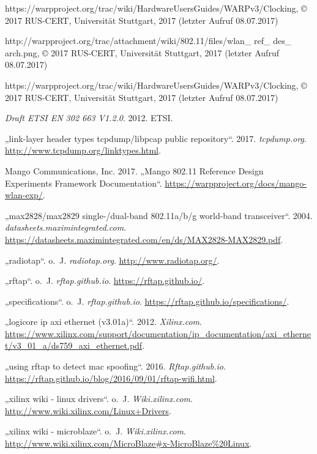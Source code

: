 \documentclass[letterpaper,11pt]{article}
\begin{document}
\begin{onehalfspace}
\begin{thebibliography}{xxxxxxxxxxxxxxxxxxx}
 https://warpproject.org/trac/wiki/HardwareUsersGuides/WARPv3/Clocking, © 2017 RUS-CERT, Universität Stuttgart, 2017 (letzter Aufruf 08.07.2017)
\thispagestyle{empty}

 http://warpproject.org/trac/attachment/wiki/802.11/files/wlan\_ ref\_ des\_ arch.png, © 2017 RUS-CERT, Universität Stuttgart, 2017 (letzter Aufruf 08.07.2017)

 \bibitem[Car2x, 2017]{[6]}https://warpproject.org/trac/wiki/HardwareUsersGuides/WARPv3/Clocking, © 2017 RUS-CERT, Universität Stuttgart, 2017 (letzter Aufruf 08.07.2017)

\hypertarget{refs}{}
\hypertarget{ref-etsi}{}
\emph{Draft ETSI EN 302 663 V1.2.0}. 2012. ETSI.

\hypertarget{ref-tcpdump}{}
„link-layer header types \textbar{} tcpdump/libpcap public repository``.
2017. \emph{tcpdump.org}. \url{http://www.tcpdump.org/linktypes.html}.

\hypertarget{ref-warp-exp}{}
Mango Communications, Inc. 2017. „Mango 802.11 Reference Design
Experiments Framework Documentation``.
\url{https://warpproject.org/docs/mango-wlan-exp/}.

\hypertarget{ref-max2829}{}
„max2828/max2829 single-/dual-band 802.11a/b/g world-band transceiver``.
2004. \emph{datasheets.maximintegrated.com}.
\url{https://datasheets.maximintegrated.com/en/ds/MAX2828-MAX2829.pdf}.

\hypertarget{ref-radiotap}{}
„radiotap``. o.~J. \emph{radiotap.org}. \url{http://www.radiotap.org/}.

\hypertarget{ref-rftap}{}
„rftap``. o.~J. \emph{rftap.github.io}. \url{https://rftap.github.io/}.

\hypertarget{ref-rftap-specifications}{}
„specifications``. o.~J. \emph{rftap.github.io}.
\url{https://rftap.github.io/specifications/}.



\hypertarget{refs}{}
\hypertarget{ref-xilinx-ethernet-core}{}
„logicore ip axi ethernet (v3.01a)``. 2012. \emph{Xilinx.com}.
\url{https://www.xilinx.com/support/documentation/ip_documentation/axi_ethernet/v3_01_a/ds759_axi_ethernet.pdf}.

\hypertarget{ref-rftap-mac}{}
„using rftap to detect mac spoofing``. 2016. \emph{Rftap.github.io}.
\url{https://rftap.github.io/blog/2016/09/01/rftap-wifi.html}.

\hypertarget{ref-xilinx-linux-drivers}{}
„xilinx wiki - linux drivers``. o.~J. \emph{Wiki.xilinx.com}.
\url{http://www.wiki.xilinx.com/Linux+Drivers}.

\hypertarget{ref-xilinx-microblaze}{}
„xilinx wiki - microblaze``. o.~J. \emph{Wiki.xilinx.com}.
\url{http://www.wiki.xilinx.com/MicroBlaze\#x-MicroBlaze\%20Linux}.



\end{thebibliography}
\end{onehalfspace}
\end{document}
